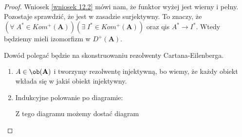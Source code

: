 \begin{proof}
  Wniosek \ref{wniosek 12.2} mówi nam, że funktor wyżej jest wierny i pełny. Pozostaje sprawdzić, że jest w zasadzie surjektywny. To znaczy, że $(\forall\;A^*\in Kom^+(\mathbf{A}))(\exists\;I^*\in Kom^+(\mathbf{A}))$ oraz qis $A^*\to I^*$. Wtedy będziemy mieli izomorfizm w $D^+(\mathbf{A})$.

  Dowód polegać będzie na skonstruowaniu rezolwenty Cartana-Eilenberga.
  \begin{enumerate}
    \item $A\in\ob(\mathbf{A})$ i tworzymy rezolwentę injektywną, bo wiemy, że każdy obiekt wkłada się w jakiś obiekt injektywny.
      \begin{center}\end{center}
    \item Indukcyjne polowanie po diagramie:
      \begin{center}\end{center}
      Z tego diagramu możemy dostać diagram
      \begin{center}
\end{center}
\end{enumerate}
\end{proof}
